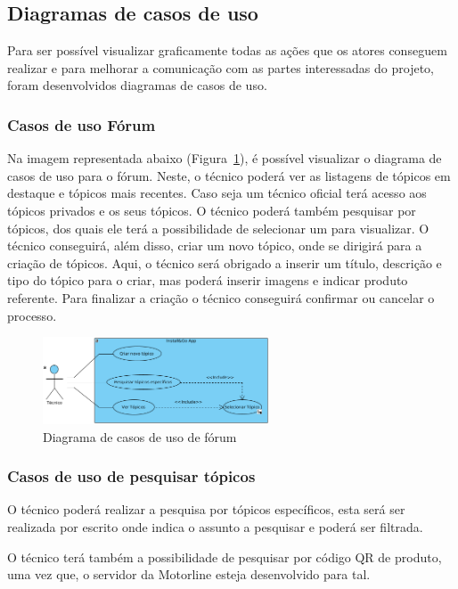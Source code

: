 
\subsection{Diagramas de casos de uso}
Para ser possível visualizar graficamente todas as ações que os 
atores conseguem realizar e para melhorar a comunicação com as 
partes interessadas do projeto, foram desenvolvidos diagramas de 
casos de uso.

\subsubsection{Casos de uso Fórum}
Na imagem representada abaixo (Figura~\ref{fig:12}), é possível 
visualizar o diagrama de casos de uso para o fórum.
Neste, o técnico poderá ver as listagens de tópicos em destaque e tópicos mais recentes. Caso seja um técnico oficial terá acesso aos tópicos privados e os seus tópicos.
O técnico poderá também pesquisar por tópicos, dos quais ele terá a possibilidade de selecionar um para visualizar. 
O técnico conseguirá, além disso, criar um novo tópico, onde se dirigirá para a criação de tópicos. Aqui, o técnico será obrigado a inserir um título, descrição e tipo do tópico para o criar, 
mas poderá inserir imagens e indicar produto referente.
Para finalizar a criação o técnico conseguirá confirmar ou cancelar o processo. 

\begin{figure}[htb]
  \centering
  \includegraphics[width=0.6\textwidth]{images/diagramas/casos_de_uso/use_case_forum.png}
  \caption{Diagrama de casos de uso de fórum}
  \label{fig:12}
\end{figure}

\subsubsection{Casos de uso de pesquisar tópicos}

O técnico poderá realizar a pesquisa por tópicos específicos, 
esta será ser realizada por escrito onde indica o assunto a pesquisar e poderá ser filtrada.

O técnico terá também a possibilidade de pesquisar por código QR de produto, uma vez que, o servidor da Motorline esteja desenvolvido para tal.

